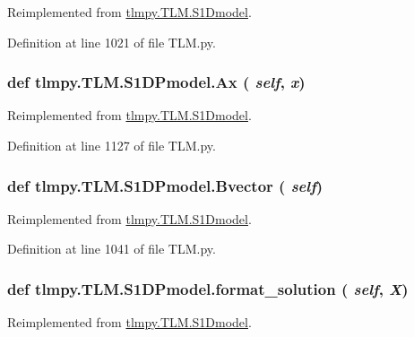 Reimplemented from \hyperlink{classtlmpy_1_1TLM_1_1S1Dmodel_afa7ad638bff97e50b1a58d9d30472eaf}{tlmpy.TLM.S1Dmodel}.

Definition at line 1021 of file TLM.py.\hypertarget{classtlmpy_1_1TLM_1_1S1DPmodel_a8e8b79a90d45ff604294420a17bf1491}{
\subsubsection[{Ax}]{\setlength{\rightskip}{0pt plus 5cm}def tlmpy.TLM.S1DPmodel.Ax ( {\em self}, \/   {\em x})}}
\label{classtlmpy_1_1TLM_1_1S1DPmodel_a8e8b79a90d45ff604294420a17bf1491}


Reimplemented from \hyperlink{classtlmpy_1_1TLM_1_1S1Dmodel_a4fd10a343d5c4e2651f9a3f9a71b40aa}{tlmpy.TLM.S1Dmodel}.

Definition at line 1127 of file TLM.py.\hypertarget{classtlmpy_1_1TLM_1_1S1DPmodel_ae99b5a939ef20edb55bfc019b8534f02}{
\subsubsection[{Bvector}]{\setlength{\rightskip}{0pt plus 5cm}def tlmpy.TLM.S1DPmodel.Bvector ( {\em self})}}
\label{classtlmpy_1_1TLM_1_1S1DPmodel_ae99b5a939ef20edb55bfc019b8534f02}


Reimplemented from \hyperlink{classtlmpy_1_1TLM_1_1S1Dmodel_aa8596d24bbf968f1b64281b3f8b96c1f}{tlmpy.TLM.S1Dmodel}.

Definition at line 1041 of file TLM.py.\hypertarget{classtlmpy_1_1TLM_1_1S1DPmodel_aa97f1c73493df12a52fd044ce03369ca}{
\subsubsection[{format\_\-solution}]{\setlength{\rightskip}{0pt plus 5cm}def tlmpy.TLM.S1DPmodel.format\_\-solution ( {\em self}, \/   {\em X})}}
\label{classtlmpy_1_1TLM_1_1S1DPmodel_aa97f1c73493df12a52fd044ce03369ca}


Reimplemented from \hyperlink{classtlmpy_1_1TLM_1_1S1Dmodel_ae393b541f64b000c9fc0fd127fd42922}{tlmpy.TLM.S1Dmodel}.

